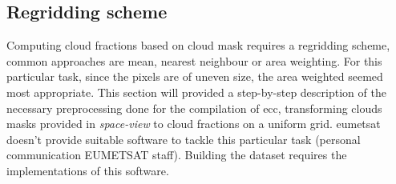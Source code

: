 \subsection{Regridding scheme} \label{sec:remapping}

Computing cloud fractions based on cloud mask requires a regridding scheme, common approaches are mean, nearest neighbour or area weighting. For this particular task, since the pixels are of uneven size, the area weighted seemed most appropriate. This section will provided a step-by-step description of the necessary preprocessing done for the compilation of \acrshort{ecc}, transforming clouds masks provided in \textit{space-view} to cloud fractions on a uniform grid. \acrshort{eumetsat} doesn't provide suitable software to tackle this particular task (personal communication EUMETSAT staff). Building the dataset requires the implementations of this software.




